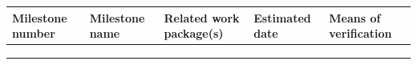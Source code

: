\documentclass[]{article}
\begin{document}
\begin{longtable}[]{@{}lllll@{}}
\toprule
\begin{minipage}[b]{0.16\columnwidth}\raggedright
Milestone number\strut
\end{minipage} & \begin{minipage}[b]{0.14\columnwidth}\raggedright
Milestone name\strut
\end{minipage} & \begin{minipage}[b]{0.22\columnwidth}\raggedright
Related work package(s)\strut
\end{minipage} & \begin{minipage}[b]{0.14\columnwidth}\raggedright
Estimated date\strut
\end{minipage} & \begin{minipage}[b]{0.20\columnwidth}\raggedright
Means of verification\strut
\end{minipage}\tabularnewline
\midrule
\endhead
\begin{minipage}[t]{0.16\columnwidth}\raggedright
\strut
\end{minipage} & \begin{minipage}[t]{0.14\columnwidth}\raggedright
\strut
\end{minipage} & \begin{minipage}[t]{0.22\columnwidth}\raggedright
\strut
\end{minipage} & \begin{minipage}[t]{0.14\columnwidth}\raggedright
\strut
\end{minipage} & \begin{minipage}[t]{0.20\columnwidth}\raggedright
\strut
\end{minipage}\tabularnewline
\begin{minipage}[t]{0.16\columnwidth}\raggedright
\strut
\end{minipage} & \begin{minipage}[t]{0.14\columnwidth}\raggedright
\strut
\end{minipage} & \begin{minipage}[t]{0.22\columnwidth}\raggedright
\strut
\end{minipage} & \begin{minipage}[t]{0.14\columnwidth}\raggedright
\strut
\end{minipage} & \begin{minipage}[t]{0.20\columnwidth}\raggedright
\strut
\end{minipage}\tabularnewline
\begin{minipage}[t]{0.16\columnwidth}\raggedright

\end{minipage}
\end{longtable}
\end{document}
